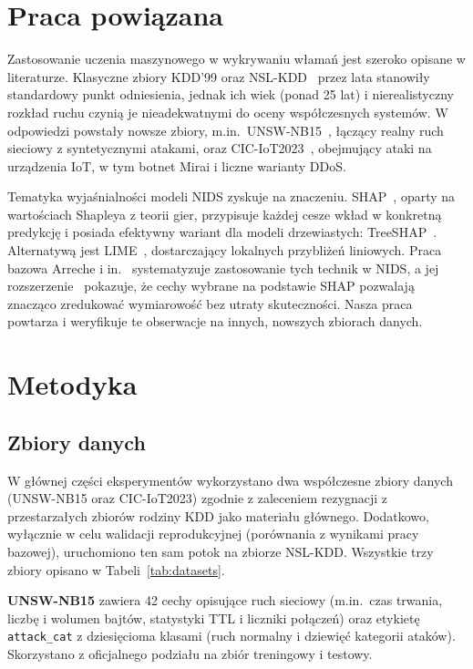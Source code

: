 \documentclass[conference]{IEEEtran}
\begin{document}
\section{Praca powiązana}
Zastosowanie uczenia maszynowego w wykrywaniu włamań jest szeroko opisane w literaturze. Klasyczne zbiory KDD'99 oraz NSL-KDD~\cite{tavallaee2009nslkdd} przez lata stanowiły standardowy punkt odniesienia, jednak ich wiek (ponad 25 lat) i nierealistyczny rozkład ruchu czynią je nieadekwatnymi do oceny współczesnych systemów. W odpowiedzi powstały nowsze zbiory, m.in.\ UNSW-NB15~\cite{moustafa2015unsw}, łączący realny ruch sieciowy z syntetycznymi atakami, oraz CIC-IoT2023~\cite{neto2023ciciot}, obejmujący ataki na urządzenia IoT, w tym botnet Mirai i liczne warianty DDoS.

Tematyka wyjaśnialności modeli NIDS zyskuje na znaczeniu. SHAP~\cite{lundberg2017shap}, oparty na wartościach Shapleya z teorii gier, przypisuje każdej cesze wkład w konkretną predykcję i posiada efektywny wariant dla modeli drzewiastych: TreeSHAP~\cite{lundberg2020treeshap}. Alternatywą jest LIME~\cite{ribeiro2016lime}, dostarczający lokalnych przybliżeń liniowych. Praca bazowa Arreche i in.~\cite{arreche2024xaiids} systematyzuje zastosowanie tych technik w NIDS, a jej rozszerzenie~\cite{arreche2024featureselection} pokazuje, że cechy wybrane na podstawie SHAP pozwalają znacząco zredukować wymiarowość bez utraty skuteczności. Nasza praca powtarza i weryfikuje te obserwacje na innych, nowszych zbiorach danych.

\section{Metodyka}

\subsection{Zbiory danych}
W głównej części eksperymentów wykorzystano dwa współczesne zbiory danych (UNSW-NB15 oraz CIC-IoT2023) zgodnie z zaleceniem rezygnacji z przestarzałych zbiorów rodziny KDD jako materiału głównego. Dodatkowo, wyłącznie w celu walidacji reprodukcyjnej (porównania z wynikami pracy bazowej), uruchomiono ten sam potok na zbiorze NSL-KDD. Wszystkie trzy zbiory opisano w Tabeli~\ref{tab:datasets}.

\textbf{UNSW-NB15} zawiera 42 cechy opisujące ruch sieciowy (m.in.\ czas trwania, liczbę i wolumen bajtów, statystyki TTL i liczniki połączeń) oraz etykietę \texttt{attack\_cat} z dziesięcioma klasami (ruch normalny i dziewięć kategorii ataków). Skorzystano z oficjalnego podziału na zbiór treningowy i testowy.
\end{document}
